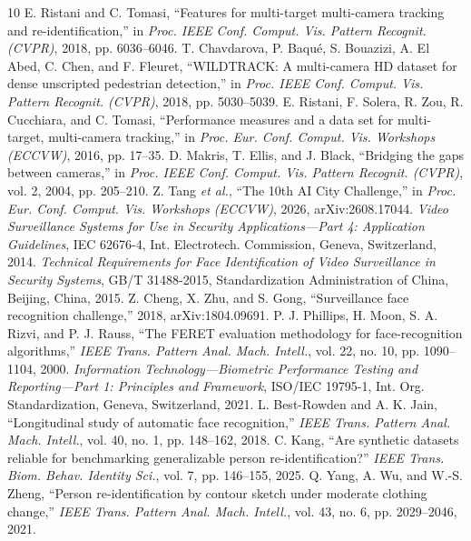 \documentclass[journal]{IEEEtran}
\newcounter{aq}
\begin{document}
\begin{thebibliography}{10}
 E. Ristani and C. Tomasi, ``Features for multi-target multi-camera tracking and re-identification,'' in \emph{Proc. IEEE Conf. Comput. Vis. Pattern Recognit. (CVPR)}, 2018, pp. 6036--6046.
 T. Chavdarova, P. Baqu\'e, S. Bouazizi, A. El Abed, C. Chen, and F. Fleuret, ``WILDTRACK: A multi-camera HD dataset for dense unscripted pedestrian detection,'' in \emph{Proc. IEEE Conf. Comput. Vis. Pattern Recognit. (CVPR)}, 2018, pp. 5030--5039.
 E. Ristani, F. Solera, R. Zou, R. Cucchiara, and C. Tomasi, ``Performance measures and a data set for multi-target, multi-camera tracking,'' in \emph{Proc. Eur. Conf. Comput. Vis. Workshops (ECCVW)}, 2016, pp. 17--35.
 D. Makris, T. Ellis, and J. Black, ``Bridging the gaps between cameras,'' in \emph{Proc. IEEE Conf. Comput. Vis. Pattern Recognit. (CVPR)}, vol. 2, 2004, pp. 205--210.
 Z. Tang \emph{et al.}, ``The 10th AI City Challenge,'' in \emph{Proc. Eur. Conf. Comput. Vis. Workshops (ECCVW)}, 2026, arXiv:2608.17044.
 \emph{Video Surveillance Systems for Use in Security Applications---Part 4: Application Guidelines}, IEC 62676-4, Int. Electrotech. Commission, Geneva, Switzerland, 2014.
 \emph{Technical Requirements for Face Identification of Video Surveillance in Security Systems}, GB/T 31488-2015, Standardization Administration of China, Beijing, China, 2015.
 Z. Cheng, X. Zhu, and S. Gong, ``Surveillance face recognition challenge,'' 2018, arXiv:1804.09691.
 P. J. Phillips, H. Moon, S. A. Rizvi, and P. J. Rauss, ``The FERET evaluation methodology for face-recognition algorithms,'' \emph{IEEE Trans. Pattern Anal. Mach. Intell.}, vol. 22, no. 10, pp. 1090--1104, 2000.
 \emph{Information Technology---Biometric Performance Testing and Reporting---Part 1: Principles and Framework}, ISO/IEC 19795-1, Int. Org. Standardization, Geneva, Switzerland, 2021.
 L. Best-Rowden and A. K. Jain, ``Longitudinal study of automatic face recognition,'' \emph{IEEE Trans. Pattern Anal. Mach. Intell.}, vol. 40, no. 1, pp. 148--162, 2018.
 C. Kang, ``Are synthetic datasets reliable for benchmarking generalizable person re-identification?'' \emph{IEEE Trans. Biom. Behav. Identity Sci.}, vol. 7, pp. 146--155, 2025.
 Q. Yang, A. Wu, and W.-S. Zheng, ``Person re-identification by contour sketch under moderate clothing change,'' \emph{IEEE Trans. Pattern Anal. Mach. Intell.}, vol. 43, no. 6, pp. 2029--2046, 2021.

\end{thebibliography}
\end{document}
